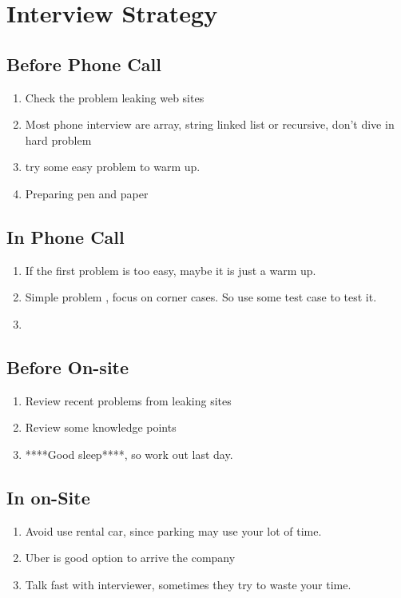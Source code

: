 \chapter{Interview Strategy}

\section{Before Phone Call }

\begin{enumerate}
    \item Check the problem leaking web sites
    \item Most phone interview are array, string linked list or recursive, don't dive in hard problem
    \item try some easy problem to warm up.
    \item Preparing pen and paper
\end{enumerate}

\section{In Phone Call  }

\begin{enumerate}
    \item If the first problem is too easy, maybe it is just a warm up.
    \item Simple problem , focus on corner cases. So use some test case to test it.
    \item
\end{enumerate}

\section{Before On-site }

\begin{enumerate}
    \item Review recent problems from leaking sites
    \item Review some knowledge points
    \item ****Good sleep****, so work out last day.
\end{enumerate}


\section{In on-Site }
\begin{enumerate}
    \item Avoid use rental car, since parking may use your lot of time.
    \item Uber is good option to arrive the company
    \item Talk fast with interviewer, sometimes they try to waste your time.

\end{enumerate}
